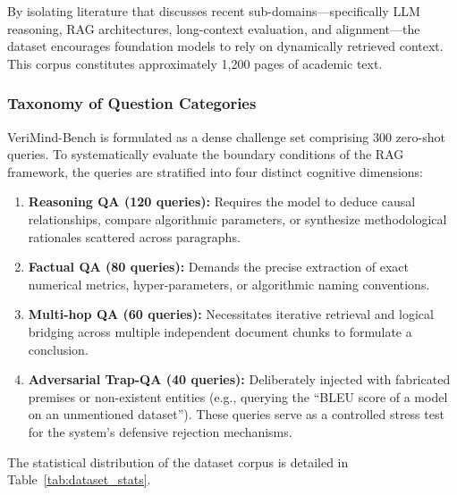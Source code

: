\documentclass[smallextended]{svjour3}
\begin{document}
By isolating literature that discusses recent sub-domains---specifically LLM reasoning, RAG architectures, long-context evaluation, and alignment---the dataset encourages foundation models to rely on dynamically retrieved context. This corpus constitutes approximately 1,200 pages of academic text.

\subsubsection{Taxonomy of Question Categories}
\label{subsec:qa_taxonomy}
VeriMind-Bench is formulated as a dense challenge set comprising 300 zero-shot queries. To systematically evaluate the boundary conditions of the RAG framework, the queries are stratified into four distinct cognitive dimensions:

\begin{enumerate}
    \item \textbf{Reasoning QA (120 queries):} Requires the model to deduce causal relationships, compare algorithmic parameters, or synthesize methodological rationales scattered across paragraphs.
    \item \textbf{Factual QA (80 queries):} Demands the precise extraction of exact numerical metrics, hyper-parameters, or algorithmic naming conventions.
    \item \textbf{Multi-hop QA (60 queries):} Necessitates iterative retrieval and logical bridging across multiple independent document chunks to formulate a conclusion.
    \item \textbf{Adversarial Trap-QA (40 queries):} Deliberately injected with fabricated premises or non-existent entities (e.g., querying the ``BLEU score of a model on an unmentioned dataset''). These queries serve as a controlled stress test for the system's defensive rejection mechanisms.
\end{enumerate}

The statistical distribution of the dataset corpus is detailed in Table~\ref{tab:dataset_stats}.

\begin{table}[t]
\centering
\caption{Statistical Distribution of the VeriMind-Bench Dataset across AI Sub-domains}
\label{tab:dataset_stats}
\renewcommand{\arraystretch}{1.2}
\end{table}
\end{document}
